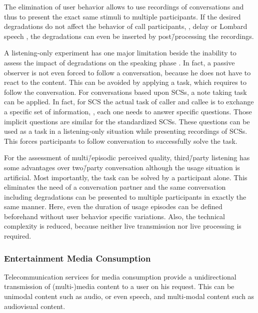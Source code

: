 The elimination of user behavior allows to use recordings of conversations and thus to present the exact same stimuli to multiple participants.
If the desired degradations do not affect the behavior of call participants, \eg, delay or Lombard speech \citep[][p.\,161]{moller_assessment_2000}, the degradations can even be inserted by post\=/processing the recordings.

A listening-only experiment has one major limitation beside the inability to assess the impact of degradations on the speaking phase \citep{gueguin_evaluation_2008}.
In fact, a passive observer is not even forced to follow a conversation, because he does not have to react to the content.
This can be avoided by applying a task, which requires to follow the conversation.
For conversations based upon \acp{SCS}, a note taking task can be applied.
In fact, for \ac{SCS} the actual task of caller and callee is to exchange a specific set of information, \ie, each one needs to answer specific questions.
Those implicit questions are similar for the standardized \acp{SCS}.
These questions can be used as a task in a listening-only situation while presenting recordings of \acp{SCS}.
This forces participants to follow conversation to successfully solve the task.

For the assessment of multi\=/episodic perceived quality, third\=/party listening has some advantages over two\=/party conversation although the usage situation is artificial.
Most importantly, the task can be solved by a participant alone.
This eliminates the need of a conversation partner and the same conversation including degradations can be presented to multiple participants in exactly the same manner.
Here, even the duration of usage episodes can be defined beforehand without user behavior specific variations.
Also, the technical complexity is reduced, because neither live transmission nor live processing is required.

\subsubsection*{Entertainment Media Consumption}
Telecommunication services for media consumption provide a unidirectional transmission of (multi-)media content to a user on his request.
This can be unimodal content such as audio, or even speech, and multi-modal content such as audiovisual content.


